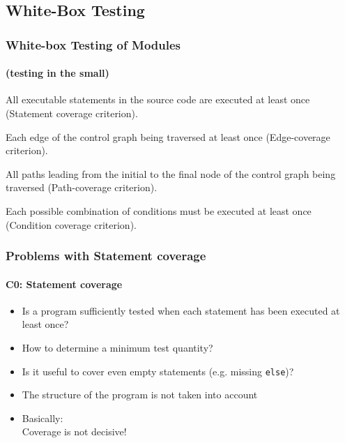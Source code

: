 \subsection{White-Box Testing}


\begin{frame}
\frametitle{White-box Testing of Modules}
\framesubtitle{(testing in the small)}
\begin{description}[Anwei]
  \item[C0: Statement Coverage:] All executable statements in the source code are executed at least once (Statement coverage criterion).
  \item[C1: Edge coverage:] Each edge of the control graph being traversed at least once (Edge-coverage criterion).
  \item[C2: Path (Branch) Coverage:] All paths leading from the initial to the final node of the control graph being traversed (Path-coverage criterion).
  \item[C3: (Compound) Condition Coverage:] Each possible combination of conditions must be executed at least once (Condition coverage criterion).
\end{description}
\end{frame}


\begin{frame}
\frametitle{Problems with Statement coverage}
\framesubtitle{C0: Statement coverage}
\begin{itemize}
  \item Is a program sufficiently tested when each statement has been executed at least once?
  \item How to determine a minimum test quantity? 
  \item Is it useful to cover even empty statements (e.g. missing \texttt{else})? 
  \item The structure of the program is not taken into account 
  \item Basically:\\
        Coverage is not decisive!
\end{itemize}
\end{frame}


